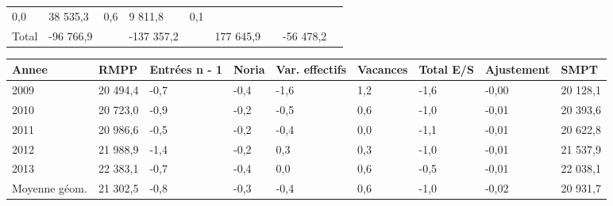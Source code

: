 \begin{longtable}[]{@{}lllllllll@{}}
\begin{minipage}[t]{0.06\columnwidth}
0,0\strut
\end{minipage} & \begin{minipage}[t]{0.12\columnwidth}\raggedright
38 535,3\strut
\end{minipage} & \begin{minipage}[t]{0.06\columnwidth}\raggedright
0,6\strut
\end{minipage} & \begin{minipage}[t]{0.08\columnwidth}\raggedright
9 811,8\strut
\end{minipage} & \begin{minipage}[t]{0.06\columnwidth}\raggedright
0,1\strut
\end{minipage}\tabularnewline
\begin{minipage}[t]{0.05\columnwidth}\raggedright
Total\strut
\end{minipage} & \begin{minipage}[t]{0.10\columnwidth}\raggedright
-96 766,9\strut
\end{minipage} & \begin{minipage}[t]{0.06\columnwidth}\raggedright
\strut
\end{minipage} & \begin{minipage}[t]{0.17\columnwidth}\raggedright
-137 357,2\strut
\end{minipage} & \begin{minipage}[t]{0.06\columnwidth}\raggedright
\strut
\end{minipage} & \begin{minipage}[t]{0.12\columnwidth}\raggedright
177 645,9\strut
\end{minipage} & \begin{minipage}[t]{0.06\columnwidth}\raggedright
\strut
\end{minipage} & \begin{minipage}[t]{0.08\columnwidth}\raggedright
-56 478,2\strut
\end{minipage} & \begin{minipage}[t]{0.06\columnwidth}\raggedright
\strut
\end{minipage}\tabularnewline
\bottomrule
\end{longtable}

\begin{longtable}[]{@{}lllllllll@{}}
\toprule
Annee & RMPP & Entrées n - 1 & Noria & Var. effectifs & Vacances & Total
E/S & Ajustement & SMPT\tabularnewline
\midrule
\endhead
2009 & 20 494,4 & -0,7 & -0,4 & -1,6 & 1,2 & -1,6 & -0,00 & 20
128,1\tabularnewline
2010 & 20 723,0 & -0,9 & -0,2 & -0,5 & 0,6 & -1,0 & -0,01 & 20
393,6\tabularnewline
2011 & 20 986,6 & -0,5 & -0,2 & -0,4 & 0,0 & -1,1 & -0,01 & 20
622,8\tabularnewline
2012 & 21 988,9 & -1,4 & -0,2 & 0,3 & 0,3 & -1,0 & -0,01 & 21
537,9\tabularnewline
2013 & 22 383,1 & -0,7 & -0,4 & 0,0 & 0,6 & -0,5 & -0,01 & 22
038,1\tabularnewline
Moyenne géom. & 21 302,5 & -0,8 & -0,3 & -0,4 & 0,6 & -1,0 & -0,02 & 20
931,7\tabularnewline
\bottomrule
\end{longtable}

